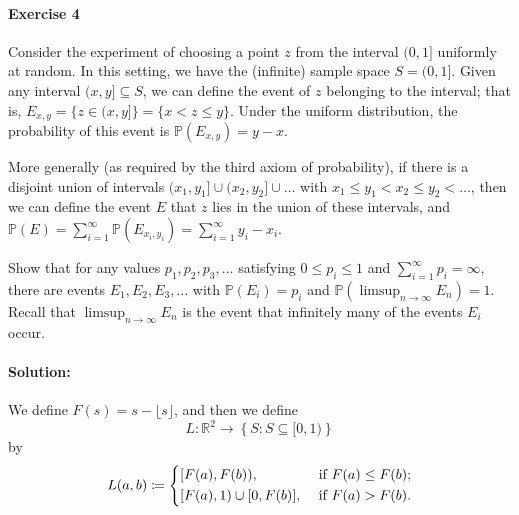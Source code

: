 \documentclass[a4paper,12pt]{article}
\begin{document}
\paragraph{Exercise 4}  Consider the experiment of choosing a point $z$ from the interval $(0,1]$ uniformly at random. In this setting, we have the (infinite) sample space $S = (0,1]$. Given any interval $(x,y] \subseteq S$, we can define the event of $z$ belonging to the interval; that is, $E_{x,y} = \{ z \in (x,y] \} = \{ x < z \le y \}$. Under the uniform distribution, the probability of this event is $\mathbb{P}\left( E_{x,y} \right) = y - x$.

More generally (as required by the third axiom of probability), if there is a disjoint union of intervals $(x_1, y_1] \cup (x_2, y_2] \cup \hdots$ with $x_1 \le y_1 < x_2 \le y_2 < \hdots$, then we can define the event $E$ that $z$ lies in the union of these intervals, and $\mathbb{P}(E) = \sum_{i=1}^\infty \mathbb{P}(E_{x_i,y_i}) = \sum_{i=1}^\infty y_i - x_i$.

Show that for any values $p_1, p_2, p_3, \hdots$ satisfying $0 \le p_i \le 1$ and $\sum_{i=1}^{\infty} p_i = \infty$, there are events $E_1, E_2, E_3, \hdots$ with $\mathbb{P}(E_i) = p_i$ and $\mathbb{P}( \limsup_{n \to \infty} E_n ) = 1$. Recall that $\limsup_{n \to \infty} E_n$ is the event that infinitely many of the events $E_i$ occur.

\paragraph{Solution: } 
We define \(F(s) = s - \lfloor s \rfloor\), and then we define 
\[
	L: \mathbb{R} ^2 \to \left\{ S: S \subseteq [0,1)  \right\}
\]
by 
\[
	L(a, b) \coloneqq \begin{dcases}
		[F(a), F(b)), &\text{ if } F(a) \leq F(b) ;\\
		[F(a), 1) \cup [0, F(b)], &\text{ if } F(a) > F(b).
	\end{dcases}
\]
\end{document}
